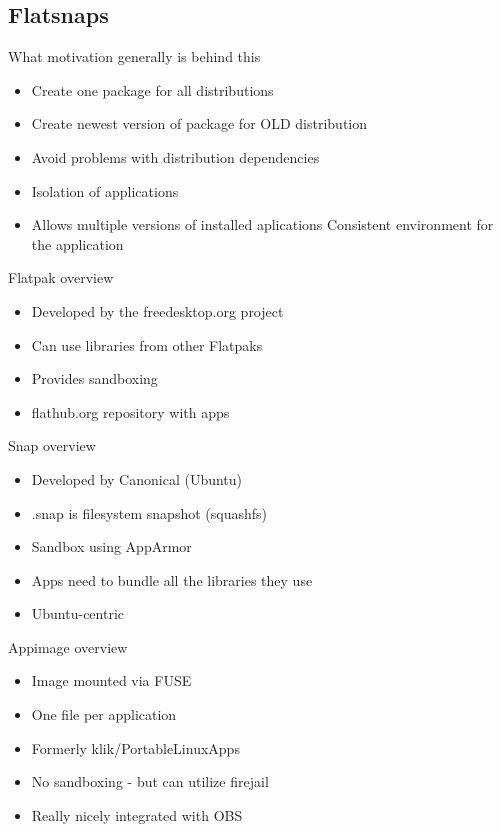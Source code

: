 \documentclass{beamer}
\begin{document}
\subsection{Flatsnaps}

\begin{frame}[t]{What motivation generally is behind this}
	\begin{itemize}
	\item Create one package for all distributions
	\item Create newest version of package for OLD distribution
	\item Avoid problems with distribution dependencies
	\item Isolation of applications
	\item Allows multiple versions of installed aplications
	\itme Consistent environment for the application
	\end{itemize}
\end{frame}

\begin{frame}[t]{Flatpak overview}
	\begin{itemize}
	\item Developed by the freedesktop.org project
	\item Can use libraries from other Flatpaks
	\item Provides sandboxing
	\item flathub.org repository with apps
	\end{itemize}
\end{frame}

\begin{frame}[t]{Snap overview}
	\begin{itemize}
	\item Developed by Canonical (Ubuntu)
	\item .snap is filesystem snapshot (squashfs)
	\item Sandbox using AppArmor
	\item Apps need to bundle all the libraries they use
	\item Ubuntu-centric
	\end{itemize}
\end{frame}

\begin{frame}[t]{Appimage overview}
	\begin{itemize}
	\item Image mounted via FUSE
	\item One file per application
	\item Formerly klik/PortableLinuxApps
	\item No sandboxing - but can utilize firejail
	\item Really nicely integrated with OBS
	\end{itemize}
\end{frame}
\end{document}
